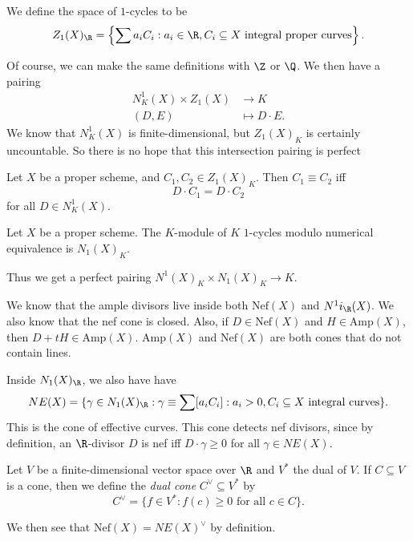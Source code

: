 \documentclass[a4paper]{article}
\newcommand\Amp{\mathrm{Amp}}
\newcommand\Nef{\mathrm{Nef}}
\begin{document}
\begin{defi}[1-cycles]
  We define the space of $1$-cycles to be
  \[
    Z_1(X)_\R = \left\{\sum a_i C_i : a_i \in \R, C_i \subseteq X\text{ integral proper curves}\right\}.
  \]
\end{defi}
Of course, we can make the same definitions with $\Z$ or $\Q$. We then have a pairing
\begin{align*}
  N^1_K(X) \times Z_1(X) &\to K\\
  (D, E) &\mapsto D \cdot E.
\end{align*}
We know that $N^1_K(X)$ is finite-dimensional, but $Z_1(X)_K$ is certainly uncountable. So there is no hope that this intersection pairing is perfect
\begin{defi}\index{$\equiv$}
  Let $X$ be a proper scheme, and $C_1, C_2 \in Z_1(X)_K$. Then $C_1 \equiv C_2$ iff
  \[
    D \cdot C_1 = D \cdot C_2
  \]
  for all $D \in N^1_K(X)$.
\end{defi}

\begin{defi}[$N_1(X)_K$]
  Let $X$ be a proper scheme. The $K$-module of $K$ $1$-cycles modulo numerical equivalence is $N_1(X)_K$.
\end{defi}
Thus we get a perfect pairing $N^1(X)_K \times N_1(X)_K \to K$.

We know that the ample divisors live inside both $\Nef(X)$ and $N^1i_\R(X)$. We also know that the nef cone is closed. Also, if $D \in \Nef(X)$ and $H \in \Amp(X)$, then $D + tH \in \Amp(X)$. $\Amp(X)$ and $\Nef(X)$ are both cones that do not contain lines. %

Inside $N_1(X)_\R$, we also have have
\[
  NE(X) = \{\gamma \in N_1(X)_\R : \gamma \equiv \sum [a_i C_i]: a_i > 0, C_i \subseteq X\text{ integral curves}\}.
\]
This is the cone of effective curves. This cone detects nef divisors, since by definition, an $\R$-divisor $D$ is nef iff $D \cdot \gamma \geq 0$ for all $\gamma \in NE(X)$.

\begin{defi}
  Let $V$ be a finite-dimensional vector space over $\R$ and $V^*$ the dual of $V$. If $C \subseteq V$ is a cone, then we define the \emph{dual cone} $C^\vee \subseteq V^*$ by
  \[
    C^\vee = \{f \in V^* : f(c) \geq 0\text{ for all }c \in C\}.
  \]
\end{defi}
We then see that $\Nef(X) = NE(X)^\vee$ by definition.
\end{document}
